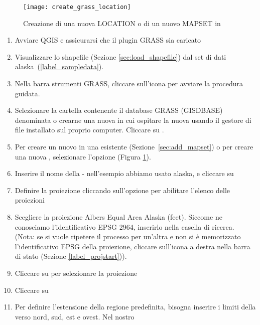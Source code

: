 \begin{figure}[ht]
\centering
\texttt{[image: create\_grass\_location]}
\caption{Creazione di una nuova LOCATION \grass o di un nuovo MAPSET in \qg \nixcaption}
\label{fig:create_grass_location}
\end{figure}

\begin{enumerate}
  \item Avviare QGIS e assicurarsi che il plugin GRASS sia caricato
  \item Visualizzare lo shapefile  (Sezione
  \ref{sec:load_shapefile}) dal set di dati alaska~(\ref{label_sampledata}).
  \item Nella barra strumenti GRASS, cliccare sull'icona
   per avviare la procedura guidata.
  \item Selezionare la cartella contenente il database GRASS (GISDBASE)
  denominata  o crearne una nuova in cui ospitare la nuova
   usando il gestore di file installato sul proprio
  computer. Cliccare su . 
  \item Per creare un nuovo  in una 
  esistente (Sezione~\ref{sec:add_mapset}) o per creare una nuova
  , selezionare l'opzione  (Figura \ref{fig:create_grass_location}).
  \item Inserire il nome della  - nell'esempio abbiamo
  usato alaska, e cliccare su  
  \item Definire la proiezione cliccando sull'opzione
   per abilitare l'elenco delle proiezioni 
  \item Scegliere la proiezione Albers Equal Area Alaska (feet). Siccome ne
  conosciamo l'identificativo EPSG 2964, inserirlo nella casella di
  ricerca. (Nota: se si vuole ripetere il processo per un'altra
   e non si è memorizzato l'identificativo EPSG della
  proiezione, cliccare sull'icona 
  a destra nella barra di stato (Sezione \ref{label_projstart})).
  \item Cliccare su  per selezionare la proiezione
  \item Cliccare su  
  \item Per definire l'estensione della regione predefinita, bisogna inserire i
  limiti della  verso nord, sud, est e ovest. Nel nostro

\end{enumerate}
